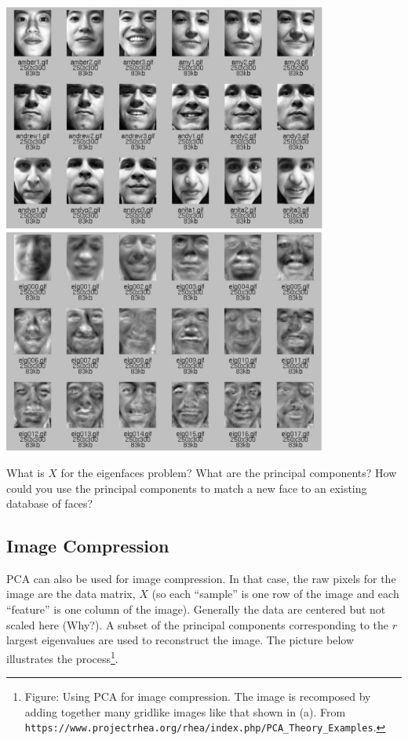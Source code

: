 \begin{center}
\includegraphics[width=0.8\textwidth]{img/l04-eigenfaces-1.png}\\[5mm]
\includegraphics[width=0.8\textwidth]{img/l04-eigenfaces-2.png}
\end{center}

\begin{question}{}
What is $X$ for the eigenfaces problem? What are the principal components? How could you use the principal components to match a new face to an existing database of faces?
\end{question}

\subsection{Image Compression}

PCA can also be used for image compression. In that case, the raw pixels for the image are the data matrix, $X$ (so each ``sample'' is one row of the image and each ``feature'' is one column of the image). Generally the data are centered but not scaled here (Why?). A subset of the principal components corresponding to the $r$ largest eigenvalues are used to reconstruct the image. The picture below illustrates the process\footnote{Figure: Using PCA for image compression. The image is recomposed by adding together many gridlike images like that shown in (a). From \texttt{https://www.projectrhea.org/rhea/index.php/PCA\_Theory\_Examples}.}. 

